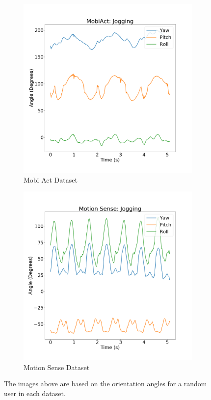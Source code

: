 \begin{figure}[H]
\begin{subfigure}{.5\textwidth}
  \centering
    \includegraphics[width = \textwidth]{images/comparisons/mobiActJoggingYPR.png}
    \caption{Mobi Act Dataset}
    \label{fig:mobiAct_YPR}
\end{subfigure}
\begin{subfigure}{.5\textwidth}
  \centering
  \centering
  \includegraphics[width=\linewidth]{images/comparisons/motionSenseJoggingYPR.png}  
  \caption{Motion Sense Dataset}
  \label{fig:motionSense_YPR}
\end{subfigure}
\caption{The images above are based on the orientation angles for a random user in each dataset.}
\label{fig:YPR_comp}
\end{figure}

